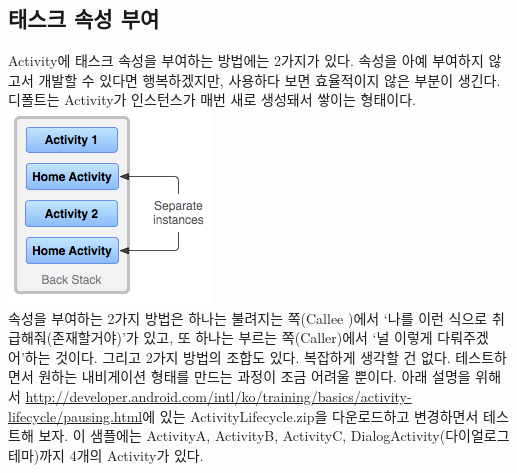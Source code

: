 
\subsection{태스크 속성 부여}
Activity에 태스크 속성을 부여하는 방법에는 2가지가 있다. 속성을 아예 부여하지 않고서 개발할 수 있다면 행복하겠지만, 사용하다 보면 효율적이지 않은 부분이 생긴다.
디폴트는 Activity가 인스턴스가 매번 새로 생성돼서 쌓이는 형태이다.\\
\includegraphics[scale=0.7]{diagram_multiple_instances}\\
속성을 부여하는 2가지 방법은 하나는 불려지는 쪽(Callee )에서 `나를 이런 식으로 취급해줘(존재할거야)'가 있고, 또 하나는 부르는 쪽(Caller)에서 `널 이렇게 다뤄주겠어'하는 것이다. 그리고 2가지 방법의 조합도 있다.
복잡하게 생각할 건 없다. 테스트하면서 원하는 내비게이션 형태를 만드는 과정이 조금 어려울 뿐이다.
아래 설명을 위해서 \url{http://developer.android.com/intl/ko/training/basics/activity-lifecycle/pausing.html}에 있는 ActivityLifecycle.zip을 다운로드하고 변경하면서 테스트해 보자. 
이 샘플에는 ActivityA, ActivityB, ActivityC, DialogActivity(다이얼로그 테마)까지 4개의 Activity가 있다.


